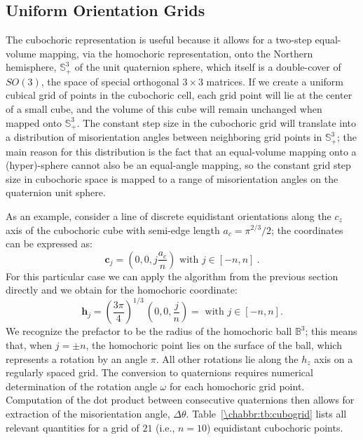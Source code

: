 \subsection{Uniform Orientation Grids}\label{\chabbr:sec:grids}
The cubochoric representation is useful because it allows for a two-step equal-volume mapping, via the homochoric representation, onto the Northern hemisphere, $\mathbb{S}_+^3$ of the unit quaternion sphere, which itself is a double-cover of $SO(3)$, the space of special orthogonal $3\times 3$ matrices.  If we create a uniform cubical grid of points in the cubochoric cell, each grid point will lie at the center of a small cube, and the volume of this cube will remain unchanged when mapped onto $\mathbb{S}_+^3$. The constant step size in the cubochoric grid will translate into a distribution of misorientation angles between neighboring grid points in $\mathbb{S}_+^3$; the main  reason for this distribution is the fact that an equal-volume mapping onto a (hyper)-sphere cannot also be an equal-angle mapping, so the constant grid step size in cubochoric space is mapped to a range of misorientation angles on the quaternion unit sphere.

As an example, consider a line of discrete equidistant orientations along the $c_z$ axis of the cubochoric cube with semi-edge length $a_c=\pi^{2/3}/2$; the coordinates can be  expressed as:
\[
	\mathbf{c}_j = (0,0, j \frac{a_c}{n})\text{ with }j\in[-n,n]\ .
\]
For this particular case we can apply the algorithm from  the previous section directly and we obtain for the homochoric coordinate:
\[
	\mathbf{h}_j = (\frac{3\pi}{4})^{1/3}\,(0,0, \frac{j}{n}) = \text{ with }j\in[-n,n] .
\]
We recognize the prefactor to be the radius of the homochoric ball $\mathbb{B}^3$; this means that, when $j=\pm n$, the homochoric point lies on the surface of the ball, which represents a rotation by an angle $\pi$.  All other rotations lie along the $h_z$ axis on a regularly spaced grid.  The conversion to quaternions requires numerical determination of the rotation angle $\omega$ for each homochoric grid point. Computation of the dot product between consecutive quaternions then allows for extraction of the misorientation angle, $\Delta\theta$.  Table~\ref{\chabbr:tb:cubogrid} lists all relevant quantities for a grid of $21$ (i.e., $n=10$) equidistant cubochoric points.

